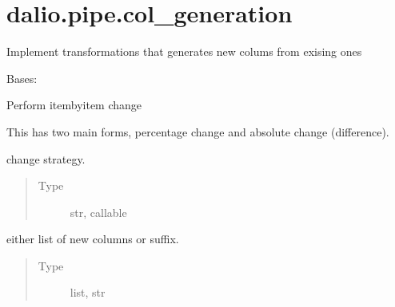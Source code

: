 \documentclass[letterpaper,10pt,english]{sphinxmanual}
\begin{document}
\section{dalio.pipe.col\_generation}
\label{\detokenize{dalio.pipe:module-dalio.pipe.col_generation}}\label{\detokenize{dalio.pipe:dalio-pipe-col-generation}}
Implement transformations that generates new colums from exising ones

\begin{fulllineitems}
\label{\detokenize{dalio.pipe:dalio.pipe.col_generation.Change}}
Bases: {\hyperref[\detokenize{dalio.pipe:dalio.pipe.pipe.Pipe}]{}}

Perform item\sphinxhyphen{}by\sphinxhyphen{}item change

This has two main forms, percentage change and absolute change
(difference).

\begin{fulllineitems}
\label{\detokenize{dalio.pipe:dalio.pipe.col_generation.Change._strategy}}
change strategy.
\begin{quote}\begin{description}
\item[{Type}] \leavevmode
str, callable

\end{description}\end{quote}

\end{fulllineitems}


\begin{fulllineitems}
\label{\detokenize{dalio.pipe:dalio.pipe.col_generation.Change._new_cols}}
either list of new columns or suffix.
\begin{quote}\begin{description}
\item[{Type}] \leavevmode
list, str


\end{description}
\end{quote}
\end{fulllineitems}
\end{fulllineitems}
\end{document}
